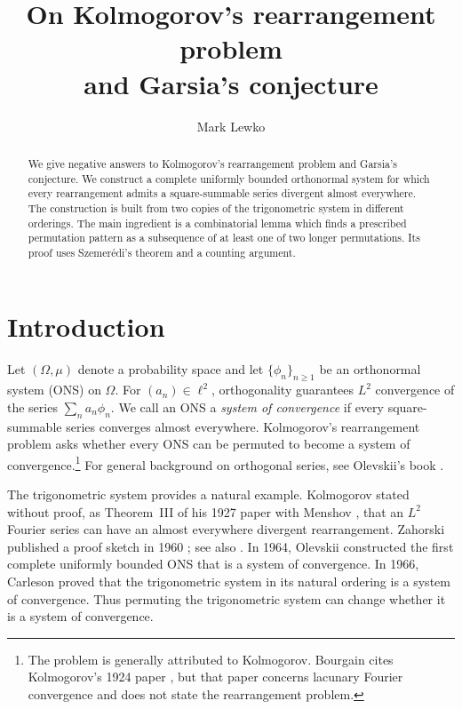 \documentclass[11pt]{article}
\title{On Kolmogorov's rearrangement problem\\ and Garsia's conjecture}
\author{Mark Lewko}
\date{}
\theoremstyle{remark}
\numberwithin{equation}{section}
\begin{document}
\maketitle

\begin{abstract}
We give negative answers to Kolmogorov's rearrangement problem and Garsia's conjecture. We construct a complete uniformly bounded orthonormal system for which every rearrangement admits a square-summable series divergent almost everywhere. The construction is built from two copies of the trigonometric system in different orderings. The main ingredient is a combinatorial lemma which finds a prescribed permutation pattern as a subsequence of at least one of two longer permutations. Its proof uses Szemer\'edi's theorem and a counting argument.
\end{abstract}

\section{Introduction}

Let $(\Omega,\mu)$ denote a probability space and let $\{\phi_n\}_{n\geq1}$ be an orthonormal system (ONS) on $\Omega$. For $(a_n)\in\ell^2$, orthogonality guarantees $L^2$ convergence of the series $\sum_n a_n\phi_n$. We call an ONS a \emph{system of convergence} if every square-summable series converges almost everywhere. Kolmogorov's rearrangement problem asks whether every ONS can be permuted to become a system of convergence.\footnote{The problem is generally attributed to Kolmogorov. Bourgain \cite{Bourgain} cites Kolmogorov's 1924 paper \cite{Kolmogorov1924}, but that paper concerns lacunary Fourier convergence and does not state the rearrangement problem.} For general background on orthogonal series, see Olevskii's book \cite{OlevskiiBook}.

The trigonometric system provides a natural example. Kolmogorov stated without proof, as Theorem~III of his 1927 paper with Menshov \cite{KolmogorovMenshov}, that an $L^2$ Fourier series can have an almost everywhere divergent rearrangement. Zahorski published a proof sketch in 1960 \cite{Zahorski}; see also \cite{BKL,Karagulyan}. In 1964, Olevskii \cite{Olevskii1964} constructed the first complete uniformly bounded ONS that is a system of convergence. In 1966, Carleson \cite{Carleson} proved that the trigonometric system in its natural ordering is a system of convergence. Thus permuting the trigonometric system can change whether it is a system of convergence.
\end{document}
